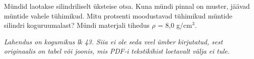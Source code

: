 
Mündid laotakse silindriliselt üksteise otsa. Kuna mündi pinnal on muster, jäävad müntide vahele tühimikud. Mitu protsenti moodustavad tühimikud müntide silindri koguruumalast? Mündi materjali tihedus $\rho$ = 8,0 g/cm$^3$.

\hint

\solu
\textit{Lahendus on kogumikus lk 43. Siia ei ole seda veel ümber kirjutatud, sest originaalis on tabel või joonis, mis PDF-i tekstikihist loetavalt välja ei tule.}
\probend
